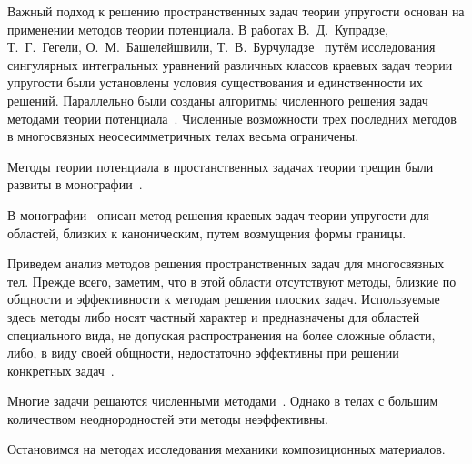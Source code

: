 Важный подход к решению пространственных задач теории упругости основан на применении методов теории потенциала. В работах В.~Д.~Купрадзе, Т.~Г.~Гегели, О.~М.~Башелейшвили, Т.~В.~Бурчуладзе~\cite{Kupradze, Burchuladze} путём исследования сингулярных интегральных уравнений различных классов краевых задач теории упругости были установлены условия существования и единственности их решений. Параллельно были созданы алгоритмы численного решения задач методами теории потенциала~\cite{Aleksandrov1973}. Численные возможности трех последних методов в многосвязных неосесимметричных телах весьма ограничены.
 
Методы теории потенциала в простанственных задачах теории трещин были развиты в монографии~\cite{Kit}.
  
В монографии~\cite{Guz1984} описан метод решения краевых задач теории упругости для областей, близких к каноническим, путем возмущения формы границы.

Приведем анализ методов решения пространственных задач для многосвязных тел. Прежде всего, заметим, что в этой области отсутствуют методы, близкие по общности и эффективности к методам решения плоских задач. Используемые здесь методы либо носят частный характер и предназначены для областей специального вида, не допуская распространения на более сложные области, либо, в виду своей общности, недостаточно эффективны при решении конкретных задач~\cite{Chen1978-2, Miyamoto, Sheikh, Strenberg}.

Многие задачи решаются численными методами~\cite{Method, Erzhanov}. Однако в телах с большим количеством неоднородностей эти методы неэффективны.

Остановимся на методах исследования механики композиционных материалов.

